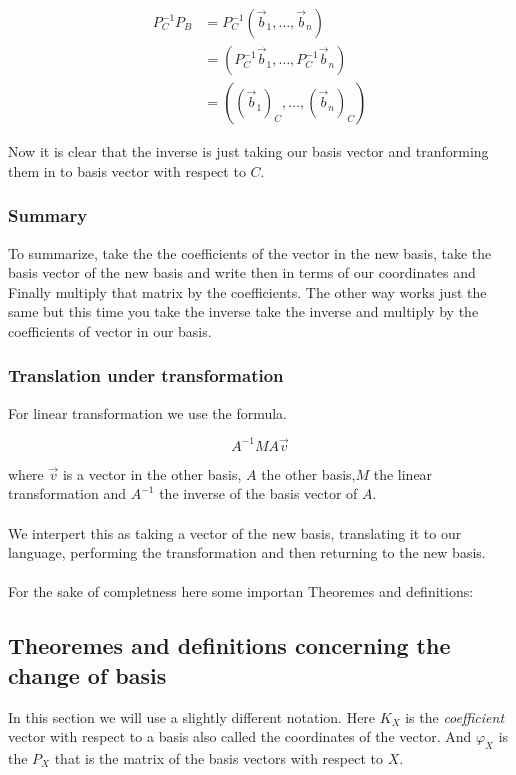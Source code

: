 \begin{align*}
P_{C}^{-1} P_B &= P_{C}^{-1}(\vec{b}_1, \dots, \vec{b}_n) \\
&= (P_{C}^{-1}\vec{b}_1, \dots, P_{C}^{-1}\vec{b}_n)\\
&= ((\vec{b}_1)_C, \dots, (\vec{b}_n)_C)
\end{align*}

Now it is clear that the inverse is just taking our basis vector and tranforming
them in to basis vector with respect to \(C\).

\subsubsection*{Summary}

To summarize, take the the coefficients of the vector in the new basis,
take the basis vector of the new basis and write then in terms of our coordinates
and Finally multiply that matrix by the coefficients. The other way works 
just the same but this time you take the inverse take the inverse and multiply
by the coefficients of vector in our basis.

\subsubsection*{Translation under transformation}

For linear transformation we use the formula.

\[A^{-1} M A \vec{v}\]

where \(\vec{v}\) is a vector in the other basis, \(A\) the
other basis,\(M\) the linear transformation and \(A^{-1}\) the inverse of
the basis vector of \(A\).
\\\\
We interpert this as taking a vector of the new basis, translating it to our language,
performing the transformation and then returning to the new basis.
\\\\
For the sake of completness here some importan Theoremes and definitions:

\subsection{Theoremes and definitions concerning the change of basis}

In this section we will use a slightly different notation. Here \(K_X\) is 
the \emph{coefficient} vector with respect to a basis also called the coordinates
of the vector. And \(\varphi_X\) is the \(P_X\) that is the matrix of the basis vectors with
respect to \(X\).

